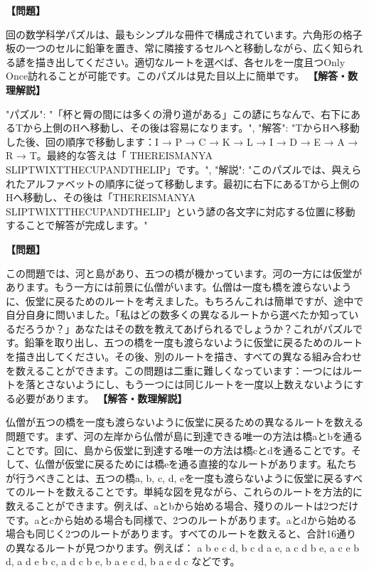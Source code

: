 \documentclass[10pt,a4paper,oneside,openany]{ltjsbook}
\begin{document}
\begin{tcolorbox}[colback=softblue,colframe=primaryblue,title=\textbf{第 260 問：THE HONEYCOMB PUZZLE.},arc=2mm,boxrule=1pt,breakable]
\textbf{【問題】}\par\vspace{0.3em}
回の数学科学パズルは、最もシンプルな冊件で構成されています。六角形の格子板の一つのセルに鉛筆を置き、常に隣接するセルへと移動しながら、広く知られる諺を描き出してください。適切なルートを選べば、各セルを一度且つOnly Once訪れることが可能です。このパズルは見た目以上に簡単です。
\tcblower
\textbf{【解答・数理解説】}\par\vspace{0.3em}
{
"パズル": "「杯と脣の間には多くの滑り道がある」この諺にちなんで、右下にあるTから上側のHへ移動し、その後は容易になります。",
"解答": "TからHへ移動した後、回の順序で移動します：I → P → C → K → L → I → D → E → A → R → T。最終的な答えは「 THEREISMANYA SLIPTWIXTTHECUPANDTHELIP」です。",
"解説": "このパズルでは、與えられたアルファベットの順序に従って移動します。最初に右下にあるTから上側のHへ移動し、その後は「THEREISMANYA SLIPTWIXTTHECUPANDTHELIP」という諺の各文字に対応する位置に移動することで解答が完成します。"
}
\end{tcolorbox}

\begin{tcolorbox}[colback=softblue,colframe=primaryblue,title=\textbf{第 261 問：河と橋の仏僧 （原題: THE MONK AND THE BRIDGES.）},arc=2mm,boxrule=1pt,breakable]
\textbf{【問題】}\par\vspace{0.3em}
この問題では、河と島があり、五つの橋が機かっています。河の一方には仮堂があります。もう一方には前景に仏僧がいます。仏僧は一度も橋を渡らないように、仮堂に戻るためのルートを考えました。もちろんこれは簡単ですが、途中で自分自身に問いました。「私はどの数多くの異なるルートから選べたか知っているだろうか？」あなたはその数を教えてあげられるでしょうか？これがパズルです。鉛筆を取り出し、五つの橋を一度も渡らないように仮堂に戻るためのルートを描き出してください。その後、別のルートを描き、すべての異なる組み合わせを数えることができます。この問題は二重に難しくなっています：一つにはルートを落とさないようにし、もう一つには同じルートを一度以上数えないようにする必要があります。
\tcblower
\textbf{【解答・数理解説】}\par\vspace{0.3em}
仏僧が五つの橋を一度も渡らないように仮堂に戻るための異なるルートを数える問題です。まず、河の左岸から仏僧が島に到達できる唯一の方法は橋aとbを通ることです。回に、島から仮堂に到達する唯一の方法は橋cとdを通ることです。そして、仏僧が仮堂に戻るためには橋eを通る直接的なルートがあります。私たちが行うべきことは、五つの橋a, b, c, d, eを一度も渡らないように仮堂に戻るすべてのルートを数えることです。単純な図を見ながら、これらのルートを方法的に数えることができます。例えば、aとbから始める場合、殘りのルートは2つだけです。aとcから始める場合も同様で、2つのルートがあります。aとdから始める場合も同じく2つのルートがあります。すべてのルートを数えると、合計16通りの異なるルートが見つかります。例えば： a b e c d, b c d a e, a c d b e, a c e b d, a d e b c, a d c b e, b a e c d, b a e d c などです。
\end{tcolorbox}
\end{document}
